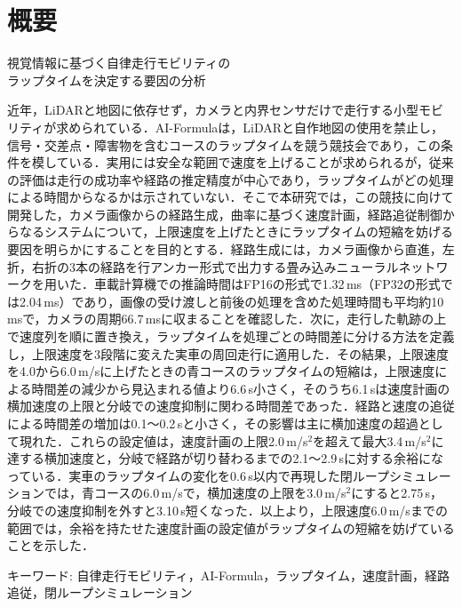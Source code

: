 \chapter*{概要}
\thispagestyle{empty}
\enlargethispage{\baselineskip}

\begin{center}
{\large 視覚情報に基づく自律走行モビリティの\\ラップタイムを決定する要因の分析}
\end{center}

{\small\renewcommand{\baselinestretch}{1.1}\selectfont
近年，LiDARと地図に依存せず，カメラと内界センサだけで走行する小型モビリティが求められている．AI-Formulaは，LiDARと自作地図の使用を禁止し，信号・交差点・障害物を含むコースのラップタイムを競う競技会であり，この条件を模している．実用には安全な範囲で速度を上げることが求められるが，従来の評価は走行の成功率や経路の推定精度が中心であり，ラップタイムがどの処理による時間からなるかは示されていない．そこで本研究では，この競技に向けて開発した，カメラ画像からの経路生成，曲率に基づく速度計画，経路追従制御からなるシステムについて，上限速度を上げたときにラップタイムの短縮を妨げる要因を明らかにすることを目的とする．経路生成には，カメラ画像から直進，左折，右折の3本の経路を行アンカー形式で出力する畳み込みニューラルネットワークを用いた．車載計算機での推論時間はFP16の形式で1.32\,ms（FP32の形式では2.04\,ms）であり，画像の受け渡しと前後の処理を含めた処理時間も平均約10\,msで，カメラの周期66.7\,msに収まることを確認した．次に，走行した軌跡の上で速度列を順に置き換え，ラップタイムを処理ごとの時間差に分ける方法を定義し，上限速度を3段階に変えた実車の周回走行に適用した．その結果，上限速度を4.0から6.0\,m/sに上げたときの青コースのラップタイムの短縮は，上限速度による時間差の減少から見込まれる値より6.6\,s小さく，そのうち6.1\,sは速度計画の横加速度の上限と分岐での速度抑制に関わる時間差であった．経路と速度の追従による時間差の増加は0.1〜0.2\,sと小さく，その影響は主に横加速度の超過として現れた．これらの設定値は，速度計画の上限2.0\,m/s$^2$を超えて最大3.4\,m/s$^2$に達する横加速度と，分岐で経路が切り替わるまでの2.1〜2.9\,sに対する余裕になっている．実車のラップタイムの変化を0.6\,s以内で再現した閉ループシミュレーションでは，青コースの6.0\,m/sで，横加速度の上限を3.0\,m/s$^2$にすると2.75\,s，分岐での速度抑制を外すと3.10\,s短くなった．以上より，上限速度6.0\,m/sまでの範囲では，余裕を持たせた速度計画の設定値がラップタイムの短縮を妨げていることを示した．

\vspace{0.5\zh}
\noindent キーワード: 自律走行モビリティ，AI-Formula，ラップタイム，速度計画，経路追従，閉ループシミュレーション
}

